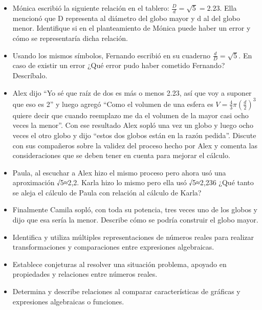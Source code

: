 \begin{itemize}
  \item Mónica escribió la siguiente relación en el tablero: $\frac{D}{d}=\sqrt{5}=2.23$. Ella mencionó que D representa al diámetro del globo mayor y d al del globo menor. Identifique si en el planteamiento de Mónica puede haber un error y cómo se representaría dicha relación.
  \item Usando los mismos símbolos, Fernando escribió en su cuaderno $\frac{d}{D}=\sqrt{5}$. En caso de existir un error ¿Qué error pudo haber cometido Fernando? Descríbalo.
  \item Alex dijo “Yo sé que raíz de dos es más o menos 2.23, así que voy a suponer que eso es 2” y luego agregó “Como el volumen de una esfera es $V=\frac{4}{3}\pi\left(\frac{d}{2}\right)^3$ quiere decir que cuando reemplazo me da el volumen de la mayor casi ocho veces la menor”. Con ese resultado Alex sopló una vez un globo y luego ocho veces el otro globo y dijo “estos dos globos están en la razón pedida”. Discute con sus compañeros sobre la validez del proceso hecho por Alex y comenta las consideraciones que se deben tener en cuenta para mejorar el cálculo.
  \item Paula, al escuchar a Alex hizo el mismo proceso pero ahora usó una aproximación √5≈2,2. Karla hizo lo mismo pero ella usó √5≈2,236 ¿Qué tanto se aleja el cálculo de Paula con relación al cálculo de Karla?
  \item Finalmente Camila sopló, con toda su potencia, tres veces uno de los globos y dijo que esa sería la menor. Describe cómo se podría construir el globo mayor.
\end{itemize}


\evidencias

\begin{itemize}
  \item Identifica y utiliza múltiples representaciones de números reales para realizar transformaciones y comparaciones entre expresiones algebraicas.
  \item Establece conjeturas al resolver una situación problema, apoyado en propiedades y relaciones entre números reales.
  \item Determina y describe relaciones al comparar características de gráficas y expresiones algebraicas o funciones.
\end{itemize}

